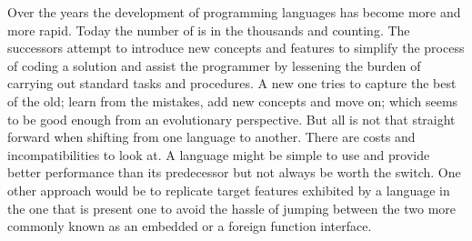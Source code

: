 \documentclass[thesis-solanki.tex]{subfiles}
\begin{document}
Over the years the development of programming languages has become more and more rapid.
Today the number of is in the thousands and counting.
The successors attempt to introduce new concepts and features to simplify the process of coding a solution and assist
the programmer by lessening the burden of carrying out standard tasks and procedures.
A new one tries to capture the best of the old; learn from the mistakes, add new concepts and move on; which seems to be
good enough from an evolutionary perspective.
But all is not that straight forward when shifting from one language to another.
There are costs and incompatibilities to look at.
A language might be simple to use and provide better performance than its predecessor but not always be worth the
switch.
One other approach would be to replicate target features exhibited by a language in the one that is present one to avoid the hassle of
jumping between the two more commonly known as an embedded or a foreign function interface.

\begin{comment}
\progLang{Prolog} has a similar story. It was born in an era where procedural programming had made everyone notice their presence. Talking about
competition, it was against something radical; the \progLang{C} programming language. The languages \progLang{C} has influenced is off the chart and
so is the performance. It had paved the way for structured procedural programming and had given birth to the Unix operating system. Though the
original version of \progLang{Prolog} has given rise to a large number of different flavours but a few drawbacks remain through the bloodline and as a
result it did become the first choice. Some basic requirements such as modules are not provided by all compilers. To make it do real world stuff, a set of
practical features are pushed in now and then which results in the loss of the purely declarative charm. The problem is that \progLang{Prolog} is fading
away, \cite{website:prolog-steam,website:prolog-death,website:prolog-killer}, not many people use it and most of the times when it is used, the variant
is usually \textit{practical} \progLang{Prolog} and the area being academia. It is not used for building large programs \cite{wikiprolog,somogyi1995
logic,website:prolog1000db}. But there are a lot of good things about \progLang{Prolog} that should not die away. Moreover, \progLang{Prolog} is ideal
for search problems.
\end{comment}
\end{document}
